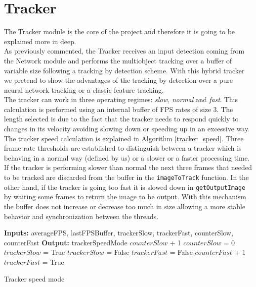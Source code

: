 \section{Tracker}
The Tracker module is the core of the project and therefore it is going to be explained more in deep.\\
As previously commented, the Tracker receives an input detection coming from the Network module and performs the multiobject tracking over a buffer of variable size following a tracking by detection scheme. With this hybrid tracker we pretend to show the advantages of the tracking by detection over a pure neural network tracking or a classic feature tracking.\\
The tracker can work in three operating regimes: \textit{slow, normal} and \textit{fast}. This calculation is performed using an internal buffer of FPS rates of size 3. The length selected is due to the fact that the tracker needs to respond quickly to changes in its velocity avoiding slowing down or speeding up in an excessive way. The tracker speed calculation is explained in Algorithm \ref{tracker_speed}. Three frame rate thresholds are established to distinguish between a tracker which is behaving in a normal way (defined by us) or a slower or a faster processing time. If the tracker is performing slower than normal the next three frames that needed to be tracked are discarded from the buffer in the \texttt{imageToTrack} function. In the other hand, if the tracker is going too fast it is slowed down in \texttt{getOutputImage} by waiting some frames to return the image to be output. With this mechanism the buffer does not increase or decrease too much in size allowing a more stable behavior and synchronization between the threads.

\begin{algorithmic}[H]
\begin{algorithm}
\State \textbf{Inputs:} averageFPS, lastFPSBuffer, trackerSlow, trackerFast, counterSlow, counterFast
\State \textbf{Output:} trackerSpeedMode
    \State $counterSlow$ + 1
        \State $counterSlow$ = 0
        \State $trackerSlow$ = True
    \EndIf
{}
    \State $trackerSlow$ = False
    \State $trackerFast$ = False
    \State $counterFast$ + 1
\State $trackerFast$ = True
\EndIf  
\EndProcedure
\caption{Tracker speed mode}\label{tracker_speed}
\end{algorithm}
\end{algorithmic}

